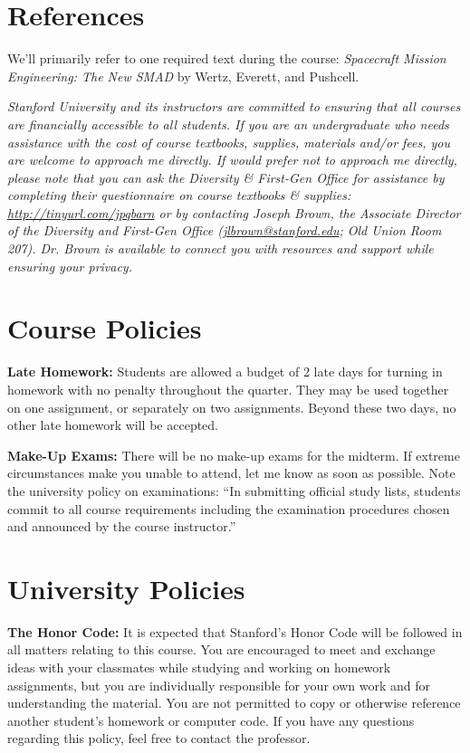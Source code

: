 \documentclass[11pt,letterpaper]{article}
\begin{document}
\section*{References}

We'll primarily refer to one required text during the course: \textit{Spacecraft Mission Engineering: The New SMAD} by Wertz, Everett, and Pushcell.

\medskip
\noindent
\emph{Stanford University and its instructors are committed to ensuring that all courses are financially accessible to all students. If you are an undergraduate who needs assistance with the cost of course textbooks, supplies, materials and/or fees, you are welcome to approach me directly. If would prefer not to approach me directly, please note that you can ask the Diversity \& First-Gen Office for assistance by completing their questionnaire on course textbooks \& supplies: \href{http://tinyurl.com/jpqbarn}{http://tinyurl.com/jpqbarn} or by contacting Joseph Brown, the Associate Director of the Diversity and First-Gen Office (\href{mailto:jlbrown@stanford.edu}{jlbrown@stanford.edu}; Old Union Room 207). Dr. Brown is available to connect you with resources and support while ensuring your privacy.}

\section*{Course Policies}

\textbf{Late Homework:} Students are allowed a budget of 2 late days for turning in homework with no penalty throughout the quarter. They may be used together on one assignment, or separately on two assignments. Beyond these two days, no other late homework will be accepted.

\medskip
\noindent
\textbf{Make-Up Exams:} There will be no make-up exams for the midterm. If extreme circumstances make you unable to attend, let me know as soon as possible. Note the university policy on examinations: ``In submitting official study lists, students commit to all course requirements including the examination procedures chosen and announced by the course instructor.''

\section*{University Policies}

\textbf{The Honor Code:} It is expected that Stanford's Honor Code will be followed in all matters relating to this course. You are encouraged to meet and exchange ideas with your classmates while studying and working on homework assignments, but you are individually responsible for your own work and for understanding the material. You are not permitted to copy or otherwise reference another student's homework or computer code. If you have any questions regarding this policy, feel free to contact the professor.
\end{document}
